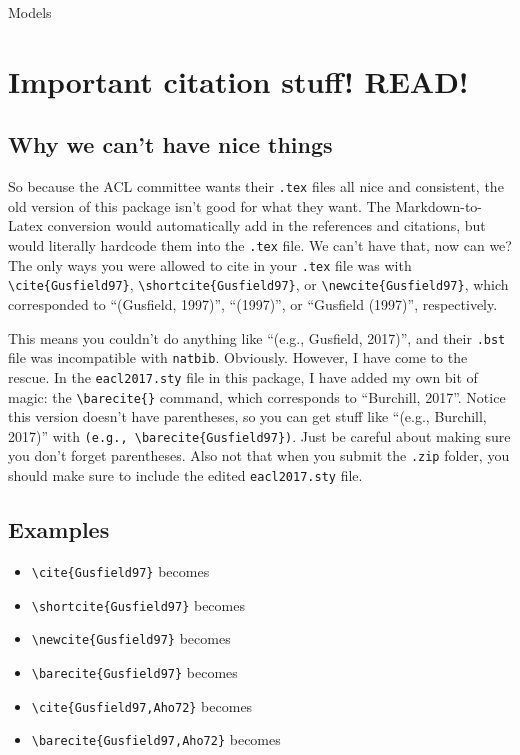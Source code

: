 \documentclass[11pt]{article}
\def\tightlist{}
\begin{document}
Models

\section{Important citation stuff!
READ!}\label{important-citation-stuff-read}

\subsection{Why we can't have nice
things}\label{why-we-cant-have-nice-things}

So because the ACL committee wants their \texttt{.tex} files all nice
and consistent, the old version of this package isn't good for what they
want. The Markdown-to-Latex conversion would automatically add in the
references and citations, but would literally hardcode them into the
\texttt{.tex} file. We can't have that, now can we? The only ways you
were allowed to cite in your \texttt{.tex} file was with
\texttt{\textbackslash{}cite\{Gusfield97\}},
\texttt{\textbackslash{}shortcite\{Gusfield97\}}, or
\texttt{\textbackslash{}newcite\{Gusfield97\}}, which corresponded to
``(Gusfield, 1997)'', ``(1997)'', or ``Gusfield (1997)'', respectively.

This means you couldn't do anything like ``(e.g., Gusfield, 2017)'', and
their \texttt{.bst} file was incompatible with \texttt{natbib}.
Obviously. However, I have come to the rescue. In the
\texttt{eacl2017.sty} file in this package, I have added my own bit of
magic: the \texttt{\textbackslash{}barecite\{\}} command, which
corresponds to ``Burchill, 2017''. Notice this version doesn't have
parentheses, so you can get stuff like ``(e.g., Burchill, 2017)'' with
\texttt{(e.g.,\ \textbackslash{}barecite\{Gusfield97\})}. Just be
careful about making sure you don't forget parentheses. Also not that
when you submit the \texttt{.zip} folder, you should make sure to
include the edited \texttt{eacl2017.sty} file.

\subsection{Examples}\label{examples}

\begin{itemize}
\tightlist
\item
  \texttt{\textbackslash{}cite\{Gusfield97\}} becomes \cite{Gusfield97}
\item
  \texttt{\textbackslash{}shortcite\{Gusfield97\}} becomes
\item
  \texttt{\textbackslash{}newcite\{Gusfield97\}} becomes
\item
  \texttt{\textbackslash{}barecite\{Gusfield97\}} becomes
\item
  \texttt{\textbackslash{}cite\{Gusfield97,Aho72\}} becomes
  \cite{Gusfield97,Aho72}
\item
  \texttt{\textbackslash{}barecite\{Gusfield97,Aho72\}} becomes
\end{itemize}
\end{document}
